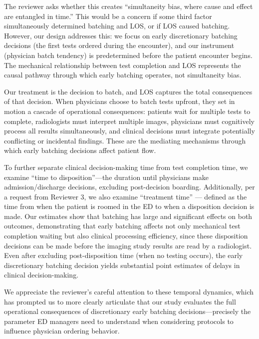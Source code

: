 \documentclass[11pt]{article}
\newcommand{\1}{\hbox{\rm 1\kern-.35em 1}}
\begin{document}
The reviewer asks whether this creates ``simultaneity bias, where cause and effect are entangled in time.'' This would be a concern if some third factor simultaneously determined batching and LOS, or if LOS caused batching. However, our design addresses this: we focus on early discretionary batching decisions (the first tests ordered during the encounter), and our instrument (physician batch tendency) is predetermined before the patient encounter begins. The mechanical relationship between test completion and LOS represents the causal pathway through which early batching operates, not simultaneity bias.

Our treatment is the decision to batch, and LOS captures the total consequences of that decision. When physicians choose to batch tests upfront, they set in motion a cascade of operational consequences: patients wait for multiple tests to complete, radiologists must interpret multiple images, physicians must cognitively process all results simultaneously, and clinical decisions must integrate potentially conflicting or incidental findings. These are the mediating mechanisms through which early batching decisions affect patient flow.

To further separate clinical decision-making time from test completion time, we examine ``time to disposition''---the duration until physicians make admission/discharge decisions, excluding post-decision boarding. Additionally, per a request from Reviewer 3, we also examine ``treatment time'' — defined as the time from when the patient is roomed in the ED to when a disposition decision is made. Our estimates show that batching has large and significant effects on both outcomes, demonstrating that early batching affects not only mechanical test completion waiting but also clinical processing efficiency, since these disposition decisions can be made before the imaging study results are read by a radiologist. Even after excluding post-disposition time (when no testing occurs), the early discretionary batching decision yields substantial point estimates of delays in clinical decision-making.

We appreciate the reviewer's careful attention to these temporal dynamics, which has prompted us to more clearly articulate that our study evaluates the full operational consequences of discretionary early batching decisions—precisely the parameter ED managers need to understand when considering protocols to influence physician ordering behavior.

\color{black}
\end{document}
